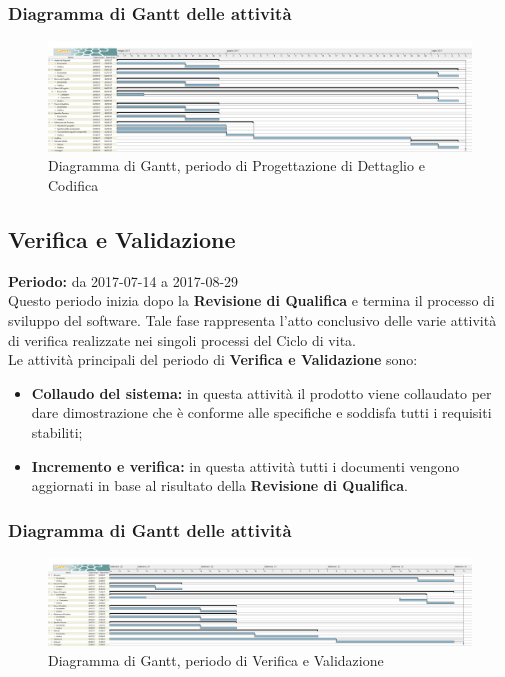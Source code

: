 	\subsubsection{Diagramma di Gantt delle attività}
	\begin{figure}[H]
		\centering
		\includegraphics[width=1\linewidth]{immagini/gantt/progettazione_dettaglio_codifica.png}
		\caption{Diagramma di Gantt, periodo di Progettazione di Dettaglio e Codifica}
	\end{figure}
	\subsection{Verifica e Validazione}
	\textbf{Periodo:} da 2017-07-14 a 2017-08-29 \\
	Questo periodo inizia dopo la \textbf{Revisione di Qualifica} e termina il processo di sviluppo del software. Tale fase rappresenta l'atto conclusivo delle varie attività di verifica realizzate nei singoli processi del Ciclo di vita. \\
	Le attività principali del periodo di \textbf{Verifica e Validazione} sono: \\
	\begin{itemize}
		\item \textbf{Collaudo del sistema:} in questa attività il prodotto viene collaudato per dare
dimostrazione che è conforme alle specifiche e soddisfa tutti i requisiti stabiliti;
		\item \textbf{Incremento e verifica:} in questa attività tutti i documenti vengono aggiornati in base al risultato della \textbf{Revisione di Qualifica}. \\
	\end{itemize}
	\subsubsection{Diagramma di Gantt delle attività}
	\begin{figure}[H]
		\centering
		\includegraphics[width=1\linewidth]{immagini/gantt/validazione.png}
		\caption{Diagramma di Gantt, periodo di Verifica e Validazione}
	\end{figure}